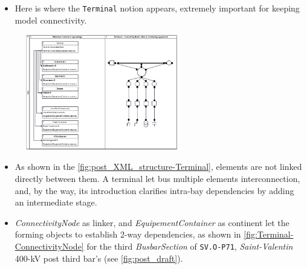   
    
    \begin{itemize}
        \begin{itemize}
            \item Here is where the \texttt{Terminal} notion appears, extremely important for keeping model connectivity.
       \end{itemize}
    \end{itemize}

\begin{figure}[h]
    \centering
    \parbox[t]{0.6\textwidth}{
    {\centering
    \includegraphics[width=0.6\textwidth]{0.figuras/Connectivite_classes-Notion_Terminal.png}}
    \label{fig:post_XML_structure-Terminal}}
\end{figure}  

\begin{itemize}[label={}]
        \begin{itemize}[label={}]
\item  As shown in the \autoref{fig:post_XML_structure-Terminal}, elements are not linked directly between them. A terminal let
bus multiple elements interconnection, and, by the way, its introduction clarifies intra-bay dependencies by adding an intermediate stage.
 \end{itemize}
    \end{itemize}
\begin{itemize}[label={}]
        \begin{itemize}
\item \textit{ConnectivityNode} as linker, and \textit{EquipementContainer} as continent let the forming objects to establish 2-way dependencies, as shown in \autoref{fig:Terminal-ConnectivityNode} for the third \textit{BusbarSection} of \texttt{SV.O-P71}, \textit{Saint-Valentin} 400-kV post third bar's (see \autoref{fig:post_draft}).
        \end{itemize}
    \end{itemize}

